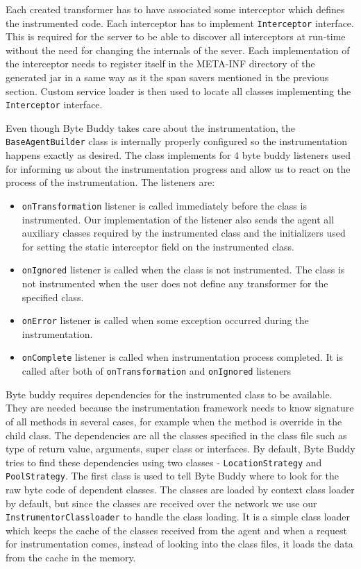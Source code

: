 Each created transformer has to have associated some interceptor which defines the instrumented code. Each interceptor has to implement \texttt{Interceptor}  interface. This is required for the server to be able to discover all interceptors at run-time without the need for changing the internals of the sever. Each implementation of the interceptor needs to register itself in the META-INF directory of the generated jar in a same way as it the span savers mentioned in the previous section. Custom service loader is then used to locate all classes implementing the \texttt{Interceptor} interface.

Even though Byte Buddy takes care about the instrumentation, the \texttt{BaseAgentBuilder} class is internally properly configured so the instrumentation happens exactly as desired. The class implements for 4 byte buddy listeners used for informing us about the instrumentation progress and allow us to react on the process of the instrumentation. The listeners are:
\begin{itemize}
	\item \texttt{onTransformation} listener is called immediately before the class is instrumented. Our implementation of the listener also sends the agent all auxiliary classes required by the instrumented class and the initializers used for setting the static interceptor field on the instrumented class.
	\item \texttt{onIgnored} listener is called when the class is not instrumented. The class is not instrumented when the user does not define any transformer for the specified class.
	\item \texttt{onError} listener is called when some exception occurred during the instrumentation.
	\item \texttt{onComplete} listener is called when instrumentation process completed. It is called after both of \texttt{onTransformation} and \texttt{onIgnored} listeners
\end{itemize}



Byte buddy requires dependencies for the instrumented class to be available. They are needed because the instrumentation framework needs to know signature of all methods in several cases, for example when the method is override in the child class. The dependencies are all the classes specified in the class file such as type of return value, arguments, super class or interfaces. 
By default, Byte Buddy tries to find these dependencies using two classes - \texttt{LocationStrategy} and \texttt{PoolStrategy}. The first class is used to tell Byte Buddy where to look for the raw byte code of dependent classes. The classes are loaded by context class loader by default, but since the classes are received over the network we use our \texttt{InstrumentorClassloader} to handle the class loading. It is a simple class loader which keeps the cache of the classes received from the agent and when a request for instrumentation comes, instead of looking into the class files, it loads the data from the cache in the memory.

